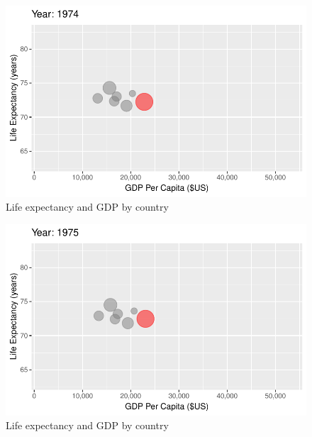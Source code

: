 \documentclass[
  letterpaper,
  DIV=11,
  numbers=noendperiod]{scrreport}
\theoremstyle{definition}
\theoremstyle{remark}
\begin{document}
\begin{figure}

{\centering \includegraphics{index_files/figure-pdf/fig-anim-country-41.pdf}

}

\caption{\label{fig-anim-country-41}Life expectancy and GDP by country}

\end{figure}

\begin{figure}

{\centering \includegraphics{index_files/figure-pdf/fig-anim-country-42.pdf}

}

\caption{\label{fig-anim-country-42}Life expectancy and GDP by country}

\end{figure}
\end{document}
